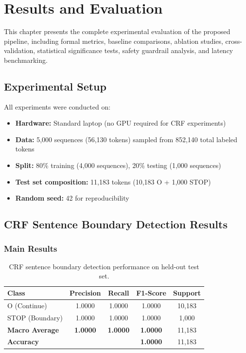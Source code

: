 \documentclass[12pt, a4paper, twoside]{report}
\begin{document}
\chapter{Results and Evaluation}
\label{ch:results}

This chapter presents the complete experimental evaluation of the proposed pipeline, including formal metrics, baseline comparisons, ablation studies, cross-validation, statistical significance tests, safety guardrail analysis, and latency benchmarking.

\section{Experimental Setup}
\label{sec:exp-setup}

All experiments were conducted on:
\begin{itemize}
    \item \textbf{Hardware:} Standard laptop (no GPU required for CRF experiments)
    \item \textbf{Data:} 5,000 sequences (56,130 tokens) sampled from 852,140 total labeled tokens
    \item \textbf{Split:} 80\% training (4,000 sequences), 20\% testing (1,000 sequences)
    \item \textbf{Test set composition:} 11,183 tokens (10,183 O + 1,000 STOP)
    \item \textbf{Random seed:} 42 for reproducibility
\end{itemize}

\section{CRF Sentence Boundary Detection Results}
\label{sec:crf-results}

\subsection{Main Results}

\begin{table}[htbp]
\centering
\caption{CRF sentence boundary detection performance on held-out test set.}
\label{tab:main-results}
\begin{tabular}{lcccc}
\toprule
\textbf{Class} & \textbf{Precision} & \textbf{Recall} & \textbf{F1-Score} & \textbf{Support} \\
\midrule
O (Continue) & 1.0000 & 1.0000 & 1.0000 & 10,183 \\
STOP (Boundary) & 1.0000 & 1.0000 & 1.0000 & 1,000 \\
\midrule
\textbf{Macro Average} & \textbf{1.0000} & \textbf{1.0000} & \textbf{1.0000} & 11,183 \\
\textbf{Accuracy} & & & \textbf{1.0000} & 11,183 \\
\bottomrule
\end{tabular}
\end{table}
\end{document}
